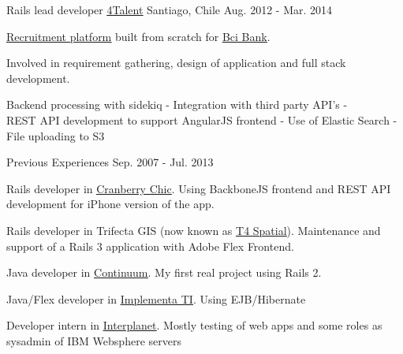 \begin{cventries}
  \cventry
    {Rails lead developer} %
    {\href{https://4talent.cl/}{\underline{4Talent}}} %
    {Santiago, Chile} %
    {Aug. 2012 - Mar. 2014} %
    {
      \begin{cvitems} %
        \item { \href{https://trabajaenbci.cl/}{\underline{Recruitment platform}}
                built from scratch for \href{https://www.bci.cl/}{\underline{Bci Bank}}.}
        \item { Involved in requirement gathering, design of application and full stack development.}
        \item { Backend processing with sidekiq - Integration with third party API's -\\
                REST API development to support AngularJS frontend -
                Use of Elastic Search - File uploading to S3}
      \end{cvitems}
    }

  \cventry
    {} %
    {Previous Experiences} %
    {} %
    {Sep. 2007 - Jul. 2013} %
    {
      \begin{cvitems} %
        \item { Rails developer in
        {\href{https://magazine.cranberrychic.com/}{\underline{Cranberry
        Chic}}}. Using BackboneJS frontend and REST API development for iPhone
        version of the app. }
        \item { Rails developer in Trifecta GIS (now known as
        {\href{https://www.t4spatial.com/}{\underline{T4 Spatial}}}). Maintenance
        and support of a Rails 3 application with Adobe Flex Frontend. }
        \item { Java developer in
        \href{https://www.continuumhq.com/}{\underline{Continuum}}. My first
        real project using Rails 2. }
        \item { Java/Flex developer in
        \href{https://www.linkedin.com/company/implementa-ti/}{\underline{Implementa
        TI}}. Using EJB/Hibernate }
        \item { Developer intern in
        \href{https://6sense.com/company/interplanet-sa/5ba611867c86660d3c6bb3fe}{\underline{Interplanet}}.
        Mostly testing of web apps and some roles as sysadmin of IBM Websphere
        servers }
      \end{cvitems}
    }

\end{cventries}

